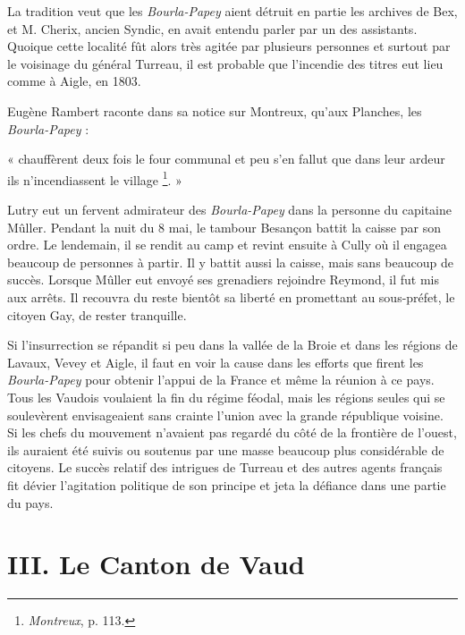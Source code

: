 \documentclass[french,twoside]{book} %
\newenvironment{quoteblock}%
  {\begin{quoting}}
  {\end{quoting}}
\newcommand\chapteropen{} %
\newcommand\chaptercont{} %
\newcommand\chapterclose{} %
\newenvironment{quotebar}{%
    \def\FrameCommand{{\color{rubric!10!}\vrule width 0.5em} \hspace{0.9em}}%
    \def\OuterFrameSep{\itemsep} %
    \MakeFramed {\advance\hsize-\width \FrameRestore}
  }%
  {%
    \endMakeFramed
  }
\renewenvironment{quoteblock}%
  {%
    \savenotes
    \setstretch{0.9}
    \begin{quotebar}
  }
  {%
    \end{quotebar}
    \spewnotes
  }
\begin{document}
\noindent La tradition veut que les \emph{Bourla-Papey} aient détruit en partie les archives de Bex, et M. Cherix, ancien Syndic, en avait entendu parler par un des assistants. Quoique cette localité fût alors très agitée par plusieurs personnes et surtout par le voisinage du général Turreau, il est probable que l’incendie des titres eut lieu comme à Aigle, en 1803.\par
Eugène Rambert raconte dans sa notice sur Montreux, qu’aux Planches, les \emph{Bourla-Papey} :\par

\begin{quoteblock}
\noindent « chauffèrent deux fois le four communal et peu s’en fallut que dans leur ardeur ils n’incendiassent le village \footnote{\emph{Montreux}, p. 113.}. »\end{quoteblock}

\noindent Lutry eut un fervent admirateur des \emph{Bourla-Papey} dans la personne du capitaine Mûller. Pendant la nuit du 8 mai, le tambour Besançon battit la caisse par son ordre. Le lendemain, il se rendit au camp et revint ensuite à Cully où il engagea beaucoup de personnes à partir. Il y battit aussi la caisse, mais sans beaucoup de succès. Lorsque Mûller eut envoyé ses grenadiers rejoindre Reymond, il fut mis aux arrêts. Il recouvra du reste bientôt sa liberté en promettant au sous-préfet, le citoyen Gay, de rester tranquille.\par
Si l’insurrection se répandit si peu dans la vallée de la Broie et dans les régions de Lavaux, Vevey et Aigle, il faut en voir la cause dans les efforts que firent les \emph{Bourla-Papey} pour obtenir l’appui de la France et même la réunion à ce pays. Tous les Vaudois voulaient la fin du régime féodal, mais les régions seules qui se soulevèrent envisageaient sans crainte l’union avec la grande république voisine. Si les chefs du mouvement n’avaient pas regardé du côté de la frontière de l’ouest, ils auraient été suivis ou soutenus par une masse beaucoup plus considérable de citoyens. Le succès relatif des intrigues de Turreau et des autres agents français fit dévier l’agitation politique de son principe et jeta la défiance dans une partie du pays.
\chapterclose


\chapteropen
\chapter[III. Le Canton de Vaud]{III. Le Canton de Vaud}

\chaptercont
\end{document}
